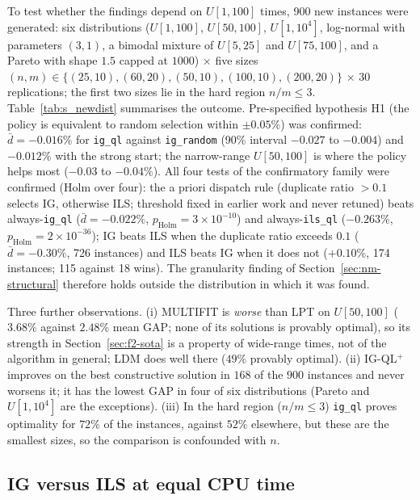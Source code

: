 \documentclass[final,3p,times,11pt,authoryear]{elsarticle}
\begin{document}
To test whether the findings depend on $U[1,100]$ times, 900 new
instances were generated: six distributions ($U[1,100]$, $U[50,100]$,
$U[1,10^4]$, log-normal with parameters $(3,1)$, a bimodal mixture of
$U[5,25]$ and $U[75,100]$, and a Pareto with shape $1.5$ capped at $1000$)
$\times$ five sizes $(n,m)\in\{(25,10),(60,20),(50,10),(100,10),(200,20)\}$
$\times$ 30 replications; the first two sizes lie in the hard region
$n/m \leq 3$. Table~\ref{tab:s_newdist} summarises the outcome.
Pre-specified hypothesis H1 (the policy is equivalent to random selection
within $\pm0.05\%$) was confirmed: $\bar d=-0.016\%$ for \texttt{ig\_ql}
against \texttt{ig\_random} (90\% interval $-0.027$ to $-0.004$) and
$-0.012\%$ with the strong start; the narrow-range $U[50,100]$ is where
the policy helps most ($-0.03$ to $-0.04\%$). All four tests of the
confirmatory family were confirmed (Holm over four): the a priori dispatch
rule (duplicate ratio $>0.1$ selects IG, otherwise ILS; threshold fixed in
earlier work and never retuned) beats always-\texttt{ig\_ql}
($\bar d=-0.022\%$, $p_{\mathrm{Holm}}=3\times10^{-10}$) and
always-\texttt{ils\_ql} ($-0.263\%$, $p_{\mathrm{Holm}}=2\times10^{-36}$);
IG beats ILS when the duplicate ratio exceeds $0.1$ ($\bar d=-0.30\%$, 726
instances) and ILS beats IG when it does not ($+0.10\%$, 174 instances;
115 against 18 wins). The granularity finding of
Section~\ref{sec:nm-structural} therefore holds outside the distribution
in which it was found.

Three further observations. (i) MULTIFIT is \emph{worse} than LPT on
$U[50,100]$ ($3.68\%$ against $2.48\%$ mean GAP; none of its solutions is
provably optimal), so its strength in Section~\ref{sec:f2-sota} is a
property of wide-range times, not of the algorithm in general; LDM does
well there ($49\%$ provably optimal). (ii) \textsc{IG-QL}$^{+}$ improves on
the best constructive solution in $168$ of the $900$ instances and never
worsens it; it has the lowest GAP in four of six distributions (Pareto and
$U[1,10^4]$ are the exceptions). (iii) In the hard region ($n/m\leq3$)
\texttt{ig\_ql} proves optimality for $72\%$ of the instances, against
$52\%$ elsewhere, but these are the smallest sizes, so the comparison is
confounded with $n$.



\subsection{IG versus ILS at equal CPU time}
\label{sec:eqcpu}
\end{document}
